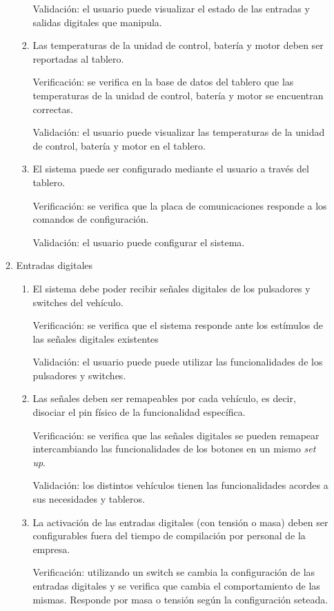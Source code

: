 \documentclass[
11pt, %
codirector, %
]{charter}
\begin{document}
\begin{enumerate}
\begin{enumerate}
\begin{enumerate}
			                  Validación: el usuario puede visualizar el estado de las entradas y salidas digitales que manipula.
			            \item Las temperaturas de la unidad de control, batería y motor deben ser reportadas al tablero.

			                  Verificación: se verifica en la base de datos del tablero que las temperaturas de la unidad de control, batería y motor se encuentran correctas.

			                  Validación: el usuario puede visualizar las temperaturas de la unidad de control, batería y motor en el tablero.
			            \item El sistema puede ser configurado mediante el usuario a través del tablero.

			                  Verificación: se verifica que la placa de comunicaciones responde a los comandos de configuración.

			                  Validación: el usuario puede configurar el sistema.
		            \end{enumerate}
		      \item Entradas digitales
		            \begin{enumerate}
			            \item El sistema debe poder recibir señales digitales de los pulsadores y switches del vehículo.

			                  Verificación: se verifica que el sistema responde ante los estímulos de las señales digitales existentes

			                  Validación: el usuario puede puede utilizar las funcionalidades de los pulsadores y switches.
			            \item Las señales deben ser remapeables por cada vehículo, es decir, disociar el pin físico de la funcionalidad específica.

			                  Verificación: se verifica que las señales digitales se pueden remapear intercambiando las funcionalidades de los botones en un mismo \textit{set up}.

			                  Validación: los distintos vehículos tienen las funcionalidades acordes a sus necesidades y tableros.
			            \item La activación de las entradas digitales (con tensión o masa) deben ser configurables fuera del tiempo de compilación por personal de la empresa.

			                  Verificación: utilizando un switch se cambia la configuración de las entradas digitales y se verifica que cambia el comportamiento de las mismas. Responde por masa o tensión según la configuración seteada.


\end{enumerate}
\end{enumerate}
\end{enumerate}
\end{document}
